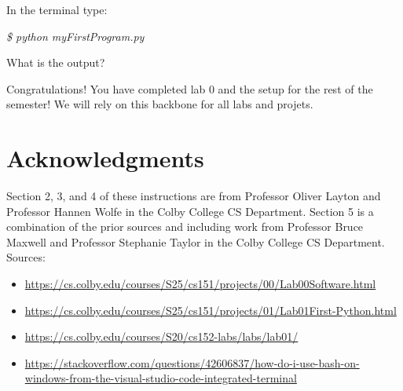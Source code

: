 \documentclass[12pt]{article}
\begin{document}
In the terminal type:
\vspace{5mm}

\textit{\$ python myFirstProgram.py}

\vspace{5mm}
What is the output?

\vspace{5mm}
Congratulations! You have completed lab 0 and the setup for the rest of the semester! We will rely on this backbone for all labs and projets.


\section{Acknowledgments}
Section 2, 3, and 4 of these instructions are from Professor Oliver Layton and Professor Hannen Wolfe in the Colby College CS Department. Section 5 is a combination of the prior sources and including work from Professor Bruce Maxwell and Professor Stephanie Taylor in the Colby College CS Department. 
Sources:
\begin{itemize}
\item \footnotesize{\url{https://cs.colby.edu/courses/S25/cs151/projects/00/Lab00Software.html}}
\item \url{https://cs.colby.edu/courses/S25/cs151/projects/01/Lab01First-Python.html}
\item \url{https://cs.colby.edu/courses/S20/cs152-labs/labs/lab01/}
\item \url{https://stackoverflow.com/questions/42606837/how-do-i-use-bash-on-windows-from-the-visual-studio-code-integrated-terminal}
\end{itemize}
\end{document}
